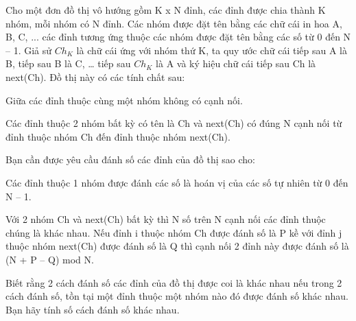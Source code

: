 Cho một đơn đồ thị vô hướng gồm K x N đỉnh, các đỉnh được chia thành K nhóm, mỗi nhóm có N đỉnh. Các nhóm được đặt tên bằng các chữ cái in hoa A, B, C, ... các đỉnh tương ứng thuộc các nhóm được đặt tên bằng các số từ 0 đến N – 1. Giả sử $Ch_{K}$   là chữ cái ứng với nhóm thứ K, ta quy ước chữ cái tiếp sau A là B, tiếp sau B là C, … tiếp sau $Ch_{K}$   là A và ký hiệu chữ cái tiếp sau Ch là next(Ch). Đồ thị này có các tính chất sau:  

   Giữa các đỉnh thuộc cùng một nhóm không có cạnh nối.  

   Các đỉnh thuộc 2 nhóm bất kỳ có tên là Ch và next(Ch) có đúng N cạnh nối từ đỉnh thuộc nhóm Ch đến đỉnh thuộc nhóm next(Ch).  

   Bạn cần được yêu cầu đánh số các đỉnh của đồ thị sao cho:  

   Các đỉnh thuộc 1 nhóm được đánh các số là hoán vị của các số tự nhiên từ 0 đến N – 1.  

   Với 2 nhóm Ch và next(Ch) bất kỳ thì N số trên N cạnh nối các đỉnh thuộc chúng là khác nhau. Nếu đỉnh i thuộc nhóm Ch được đánh số là P kề với đỉnh j thuộc nhóm next(Ch) được đánh số là Q thì cạnh nối 2 đỉnh này được đánh số là (N + P – Q) mod N.  

   Biết rằng 2 cách đánh số các đỉnh của đồ thị được coi là khác nhau nếu trong 2 cách đánh số, tồn tại một đỉnh thuộc một nhóm nào đó được đánh số khác nhau. Bạn hãy tính số cách đánh số khác nhau.
